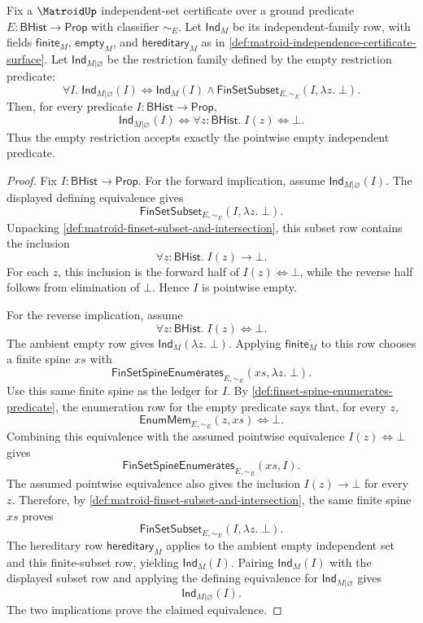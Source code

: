 \begin{theorem}
\label{thm:matroid-empty-restriction-singleton-independent-family}
Fix a $\MatroidUp$ independent-set certificate over a ground predicate $E:\mathsf{BHist}\to\mathsf{Prop}$ with classifier $\sim_E$. Let $\mathsf{Ind}_M$ be its independent-family row, with fields $\mathsf{finite}_M$, $\mathsf{empty}_M$, and $\mathsf{hereditary}_M$ as in \autoref{def:matroid-independence-certificate-surface}. Let $\mathsf{Ind}_{M|\varnothing}$ be the restriction family defined by the empty restriction predicate:
$$
\forall I.\;
\mathsf{Ind}_{M|\varnothing}(I)\Longleftrightarrow
\mathsf{Ind}_M(I)\land
\mathsf{FinSetSubset}_{E,\sim_E}(I,\lambda z.\;\bot).
$$
Then, for every predicate $I:\mathsf{BHist}\to\mathsf{Prop}$,
$$
\mathsf{Ind}_{M|\varnothing}(I)
\Longleftrightarrow
\forall z:\mathsf{BHist}.\; I(z)\Longleftrightarrow \bot.
$$
Thus the empty restriction accepts exactly the pointwise empty independent predicate.
\end{theorem}
\begin{proof}
Fix $I:\mathsf{BHist}\to\mathsf{Prop}$. For the forward implication, assume $\mathsf{Ind}_{M|\varnothing}(I)$. The displayed defining equivalence gives
$$
\mathsf{FinSetSubset}_{E,\sim_E}(I,\lambda z.\;\bot).
$$
Unpacking \autoref{def:matroid-finset-subset-and-intersection}, this subset row contains the inclusion
$$
\forall z:\mathsf{BHist}.\; I(z)\to \bot.
$$
For each $z$, this inclusion is the forward half of $I(z)\Longleftrightarrow\bot$, while the reverse half follows from elimination of $\bot$. Hence $I$ is pointwise empty.

For the reverse implication, assume
$$
\forall z:\mathsf{BHist}.\; I(z)\Longleftrightarrow \bot.
$$
The ambient empty row gives $\mathsf{Ind}_M(\lambda z.\;\bot)$. Applying $\mathsf{finite}_M$ to this row chooses a finite spine $xs$ with
$$
\mathsf{FinSetSpineEnumerates}_{E,\sim_E}(xs,\lambda z.\;\bot).
$$
Use this same finite spine as the ledger for $I$. By \autoref{def:finset-spine-enumerates-predicate}, the enumeration row for the empty predicate says that, for every $z$,
$$
\mathsf{EnumMem}_{E,\sim_E}(z,xs)\Longleftrightarrow \bot.
$$
Combining this equivalence with the assumed pointwise equivalence $I(z)\Longleftrightarrow\bot$ gives
$$
\mathsf{FinSetSpineEnumerates}_{E,\sim_E}(xs,I).
$$
The assumed pointwise equivalence also gives the inclusion $I(z)\to\bot$ for every $z$. Therefore, by \autoref{def:matroid-finset-subset-and-intersection}, the same finite spine $xs$ proves
$$
\mathsf{FinSetSubset}_{E,\sim_E}(I,\lambda z.\;\bot).
$$
The hereditary row $\mathsf{hereditary}_M$ applies to the ambient empty independent set and this finite-subset row, yielding $\mathsf{Ind}_M(I)$. Pairing $\mathsf{Ind}_M(I)$ with the displayed subset row and applying the defining equivalence for $\mathsf{Ind}_{M|\varnothing}$ gives
$$
\mathsf{Ind}_{M|\varnothing}(I).
$$
The two implications prove the claimed equivalence.
\end{proof}

